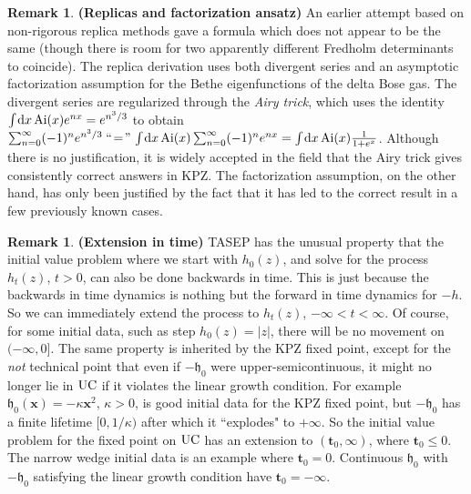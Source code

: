 \documentclass[letterpaper,reqno,11pt,oneside,final]{amsart}
\theoremstyle{definition}
\newtheorem{rem}[thm]{Remark}
\newcommand{\fh}{\mathfrak{h}}
\newcommand{\ts}{\hspace{0.1em}}
\newcommand{\tsm}{\hspace{-0.1em}}
\newcommand{\uptext}[1]{\text{\upshape{#1}}}
\DeclareMathOperator{\UC}{\uptext{UC}}
\DeclareMathOperator{\Ai}{\uptext{Ai}}
\renewcommand{\d}{\mathrm{d}}
\newcommand{\ft}{\mathbf{t}}
\newcommand{\fx}{\mathbf{x}}
\numberwithin{equation}{section}
\begin{document}
\begin{rem}{\bf (Replicas and factorization ansatz)}
\enspace An earlier attempt \cite{cqrFixedPt} based on non-rigorous replica methods gave a formula which does not appear to be the same (though there is room for two apparently different Fredholm determinants to coincide).
The replica derivation uses both divergent series and an asymptotic factorization assumption \cite{prolhacSpohn} for the Bethe eigenfunctions of the delta Bose gas.  
The divergent series are regularized through the \emph{Airy trick}, which uses the identity $\int\tsm\d x\Ai(x) e^{nx} = e^{n^3/3}$ to obtain $\sum_{n=0}^\infty (-1)^n e^{n^3/3} \,\ts``\!=\!"\,  \int\tsm\d x\Ai(x) \sum_{n=0}^\infty (-1)^ne^{nx} = \int\tsm\d x\Ai(x)\frac{1}{1+ e^x}$.
Although there is no justification, it is widely accepted in the field that the Airy trick gives consistently correct answers in KPZ.
The factorization assumption, on the other hand, has only been justified by the fact that it has led to the correct result in a few previously known cases.
\end{rem}

\begin{rem}{\bf (Extension in time)}
\enspace TASEP has the unusual property that the initial value problem where we start with $h_0(z)$, and solve for the process $h_t(z)$, $t>0$, can also be done backwards in time.  This is just because the backwards in time dynamics is nothing but the forward in time dynamics for $-h$.  So we can immediately extend the process to $h_t(z)$, $-\infty<t<\infty$.  Of course, for some initial data, such as step $h_0(z) =|z|$,
there will be no movement on $(-\infty,0]$.  The same property is inherited by the KPZ fixed point, except for the \emph{not} technical point that  even if $-\fh_0$ were upper-semicontinuous, it might no longer lie in $\UC$ if it violates the linear growth condition.  For example $\fh_0(\fx) = -\kappa \fx^2$, $\kappa>0$, is good initial data for the KPZ fixed point, but $-\fh_0$ has a finite lifetime $[0,1/\kappa)$ after which it ``explodes" to $+\infty$.  So the initial value problem for the fixed point on $\UC$ has an extension to $(\ft_0,\infty)$, where $\ft_0\le 0$.  The narrow wedge initial data is an
example where $\ft_0=0$.  Continuous $\fh_0$ with $-\fh_0$ satisfying the linear growth condition have $\ft_0=-\infty$.
\end{rem}
\end{document}

